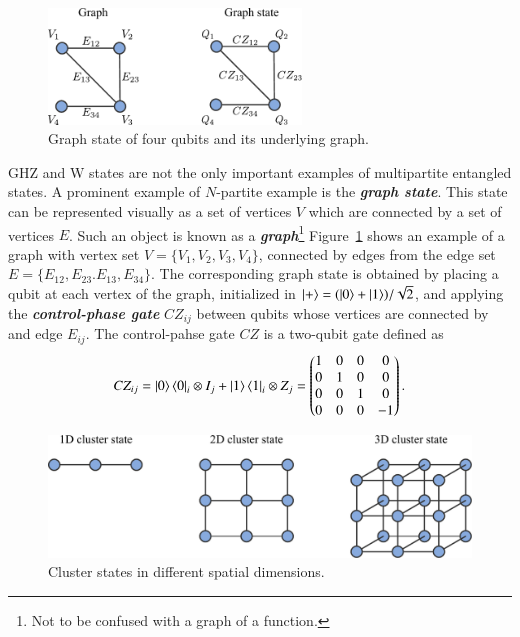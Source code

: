 \begin{figure}[t]
    \centering
    \includegraphics[width=0.6\textwidth]{lesson14/14-2_graph_state.pdf}
    \caption[Graph state.]{Graph state of four qubits and its underlying graph.}
    \label{fig:14-2_graph_state}
\end{figure}

GHZ and W states are not the only important examples of multipartite entangled states.
A prominent example of $N$-partite example is the \textbf{\textit{graph state}}.
This state can be represented visually as a set of vertices $V$ which are connected by a set of vertices $E$.
Such an object is known as a \textit{\textbf{graph}}\footnote{Not to be confused with a graph of a function.}
Figure~\ref{fig:14-2_graph_state} shows an example of a graph with vertex set $V=\{V_1, V_2, V_3, V_4\}$, connected by edges from the edge set $E=\{ E_{12}, E_{23}. E_{13}, E_{34} \}$.
The corresponding graph state is obtained by placing a qubit at each vertex of the graph, initialized in $\left| + \right\rangle = (\left| 0 \right\rangle + \left| 1 \right\rangle) / \sqrt{2}$, and applying the \textbf{\textit{control-phase gate}} $CZ_{ij}$ between qubits whose vertices are connected by and edge $E_{ij}$.
The control-pahse gate $CZ$ is a two-qubit gate defined as
\begin{equation}
    CZ_{ij} = \left| 0 \right\rangle\left\langle 0 \right|_i \otimes I_j + \left| 1 \right\rangle\left\langle 1 \right|_i \otimes Z_j = \begin{pmatrix}
        1 & 0 & 0 & 0 \\
        0 & 1 & 0 & 0 \\
        0 & 0 & 1 & 0 \\
        0 & 0 & 0 & -1
    \end{pmatrix}.
\end{equation}
\begin{figure}[t]
    \centering
    \includegraphics[width=\textwidth]{lesson14/14-2_cluster_state.pdf}
    \caption[Cluster state.]{Cluster states in different spatial dimensions.}
    \label{fig:14-2_cluster_state}
\end{figure}

